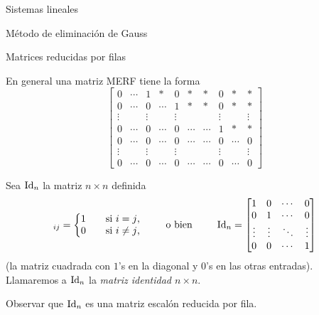 \begin{chapter}{Sistemas lineales}
\begin{section}{Método de eliminación de Gauss }
\begin{subsection}{Matrices reducidas por filas}
                
                En general una matriz  MERF tiene la forma
                \begin{equation}\label{merf-general}
                \begin{bmatrix}
                0& \cdots & 1 & *&0&* &* &0& * &*\\
                0& \cdots &0 &\cdots & 1& *  & * & 0& * &*\\
                \vdots&  &\vdots &  &\vdots && &\vdots& &\vdots\\
                0& \cdots &0& \cdots & 0&\cdots &\cdots & 1& * &* \\
                0& \cdots &0& \cdots & 0&\cdots &\cdots & 0& \cdots &0 \\
                \vdots&  &\vdots &  &\vdots && &\vdots& &\vdots\\
                0& \cdots &0& \cdots & 0&\cdots &\cdots & 0& \cdots &0
                \end{bmatrix}
                \end{equation}
                
                \begin{definicion}
                    Sea $\operatorname{Id}_n$ la matriz  $n \times n$ definida 
                    \begin{equation*}
                    [\Id_n]_{ij} = \left\{ \begin{matrix}
                    1 && \text{si $i=j$,}\\
                    0 && \text{si $i\not=j$,}
                    \end{matrix}\right.\qquad \text{ o bien }\qquad \Id_n =
                    \begin{bmatrix}
                    1 & 0 & \cdots & 0 \\
                    0 & 1 & \cdots & 0 \\
                    \vdots & \vdots & \ddots & \vdots \\
                    0 & 0 & \cdots & 1
                    \end{bmatrix}
                    \end{equation*}
                    (la matriz cuadrada con $1$'s en la diagonal y $0$'s en las otras entradas). Llamaremos a $\operatorname{Id}_n$ la \textit{matriz identidad $n \times n$}.
                \end{definicion}
                
                Observar que $\operatorname{Id}_n$ es una matriz escalón reducida por fila.
                

\end{subsection}
\end{section}
\end{chapter}
